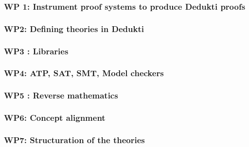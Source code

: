 \subsubsection{WP 1: Instrument proof systems to produce Dedukti proofs}



\subsubsection{WP2: Defining theories in Dedukti}



\subsubsection{WP3 : Libraries}



\subsubsection{WP4: ATP, SAT, SMT, Model checkers}



\subsubsection{WP5 : Reverse mathematics}



\subsubsection{WP6: Concept alignment}



\subsubsection{WP7: Structuration of the theories}




